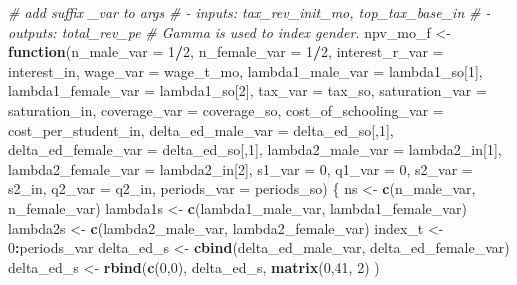 \documentclass[]{article}
\newenvironment{Shaded}{\begin{snugshade}}{\end{snugshade}}
\newcommand{\CommentTok}[1]{\textcolor[rgb]{0.56,0.35,0.01}{\textit{#1}}}
\newcommand{\ControlFlowTok}[1]{\textcolor[rgb]{0.13,0.29,0.53}{\textbf{#1}}}
\newcommand{\DataTypeTok}[1]{\textcolor[rgb]{0.13,0.29,0.53}{#1}}
\newcommand{\DecValTok}[1]{\textcolor[rgb]{0.00,0.00,0.81}{#1}}
\newcommand{\KeywordTok}[1]{\textcolor[rgb]{0.13,0.29,0.53}{\textbf{#1}}}
\newcommand{\NormalTok}[1]{#1}
\newcommand{\OperatorTok}[1]{\textcolor[rgb]{0.81,0.36,0.00}{\textbf{#1}}}
\newcommand{\StringTok}[1]{\textcolor[rgb]{0.31,0.60,0.02}{#1}}
\begin{document}
\begin{Shaded}
\begin{Highlighting}[]
\CommentTok{# add suffix _var to args }
\CommentTok{# - inputs: tax_rev_init_mo, top_tax_base_in  }
\CommentTok{# - outputs: total_rev_pe }
\CommentTok{# Gamma is used to index gender.}
\NormalTok{npv_mo_f <-}\StringTok{ }\ControlFlowTok{function}\NormalTok{(}\DataTypeTok{n_male_var =} \DecValTok{1}\OperatorTok{/}\DecValTok{2}\NormalTok{, }\DataTypeTok{n_female_var =} \DecValTok{1}\OperatorTok{/}\DecValTok{2}\NormalTok{, }
                \DataTypeTok{interest_r_var =}\NormalTok{ interest_in,}
                \DataTypeTok{wage_var =}\NormalTok{ wage_t_mo,}
                \DataTypeTok{lambda1_male_var =}\NormalTok{ lambda1_so[}\DecValTok{1}\NormalTok{],}
                \DataTypeTok{lambda1_female_var =}\NormalTok{ lambda1_so[}\DecValTok{2}\NormalTok{], }
                \DataTypeTok{tax_var =}\NormalTok{ tax_so,}
                \DataTypeTok{saturation_var =}\NormalTok{ saturation_in,             }
                \DataTypeTok{coverage_var =}\NormalTok{ coverage_so,}
                \DataTypeTok{cost_of_schooling_var =}\NormalTok{ cost_per_student_in,}
                \DataTypeTok{delta_ed_male_var =}\NormalTok{ delta_ed_so[,}\DecValTok{1}\NormalTok{],}
                \DataTypeTok{delta_ed_female_var =}\NormalTok{ delta_ed_so[,}\DecValTok{1}\NormalTok{], }
                \DataTypeTok{lambda2_male_var =}\NormalTok{ lambda2_in[}\DecValTok{1}\NormalTok{],}
                \DataTypeTok{lambda2_female_var =}\NormalTok{ lambda2_in[}\DecValTok{2}\NormalTok{],}
                \DataTypeTok{s1_var =} \DecValTok{0}\NormalTok{, }\DataTypeTok{q1_var =} \DecValTok{0}\NormalTok{, }\DataTypeTok{s2_var =}\NormalTok{ s2_in, }\DataTypeTok{q2_var =}\NormalTok{ q2_in,}
                \DataTypeTok{periods_var =}\NormalTok{ periods_so) \{}
\NormalTok{  ns <-}\StringTok{ }\KeywordTok{c}\NormalTok{(n_male_var, n_female_var)}
\NormalTok{  lambda1s <-}\StringTok{ }\KeywordTok{c}\NormalTok{(lambda1_male_var, lambda1_female_var)}
\NormalTok{  lambda2s <-}\StringTok{ }\KeywordTok{c}\NormalTok{(lambda2_male_var, lambda2_female_var)}
\NormalTok{  index_t <-}\StringTok{ }\DecValTok{0}\OperatorTok{:}\NormalTok{periods_var}
\NormalTok{  delta_ed_s <-}\StringTok{ }\KeywordTok{cbind}\NormalTok{(delta_ed_male_var, delta_ed_female_var) }
\NormalTok{  delta_ed_s <-}\StringTok{ }\KeywordTok{rbind}\NormalTok{(}\KeywordTok{c}\NormalTok{(}\DecValTok{0}\NormalTok{,}\DecValTok{0}\NormalTok{), delta_ed_s, }\KeywordTok{matrix}\NormalTok{(}\DecValTok{0}\NormalTok{,}\DecValTok{41}\NormalTok{, }\DecValTok{2}\NormalTok{) )}


\end{Highlighting}
\end{Shaded}
\end{document}
